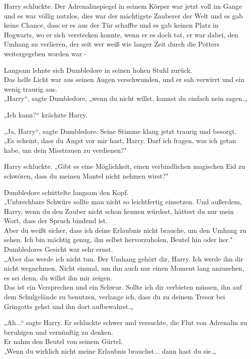 {Harry schluckte. Der Adrenalinspiegel in seinem Körper war jetzt voll im Gange und es war völlig nutzlos, dies war der mächtigste Zauberer der Welt und es gab keine Chance, dass er es aus der Tür schaffte und es gab keinen Platz in Hogwarts, wo er sich verstecken konnte, wenn er es doch tat, er war dabei, den Umhang zu verlieren, der seit wer weiß wie langer Zeit durch die Potters weitergegeben worden war -

Langsam lehnte sich Dumbledore in seinen hohen Stuhl zurück.\\ Das helle Licht war aus seinen Augen verschwunden, und er sah verwirrt und ein wenig traurig aus.\\ „Harry“, sagte Dumbledore, „wenn du nicht willst, kannst du einfach nein sagen.„

„Ich kann?“ krächzte Harry.

„Ja, Harry“, sagte Dumbledore. Seine Stimme klang jetzt traurig und besorgt. „Es scheint, dass du Angst vor mir hast, Harry. Darf ich fragen, was ich getan habe, um dein Misstrauen zu verdienen?"

Harry schluckte. „Gibt es eine Möglichkeit, einen verbindlichen magischen Eid zu schwören, dass du meinen Mantel nicht nehmen wirst?"

Dumbledore schüttelte langsam den Kopf.\\ „Unbrechbare Schwüre sollte man nicht so leichtfertig einsetzen. Und außerdem, Harry, wenn du den Zauber nicht schon kennen würdest, hättest du nur mein Wort, dass der Spruch bindend ist.\\ Aber du weißt sicher, dass ich deine Erlaubnis nicht brauche, um den Umhang zu sehen. Ich bin mächtig genug, ihn selbst hervorzuholen, Beutel hin oder her."\\ Dumbledores Gesicht war sehr ernst.\\ „Aber das werde ich nicht tun. Der Umhang gehört dir, Harry. Ich werde ihn dir nicht wegnehmen. Nicht einmal, um ihn auch nur einen Moment lang anzusehen, es sei denn, du willst ihn mir zeigen.\\ Das ist ein Versprechen und ein Schwur. Sollte ich dir verbieten müssen, ihn auf dem Schulgelände zu benutzen, verlange ich, dass du zu deinem Tresor bei Gringotts gehst und ihn dort aufbewahrst.„

„Ah...“ sagte Harry. Er schluckte schwer und versuchte, die Flut von Adrenalin zu beruhigen und vernünftig zu denken.\\ Er nahm den Beutel von seinem Gürtel.\\ „Wenn du wirklich nicht meine Erlaubnis brauchst... dann hast du sie.„

}
